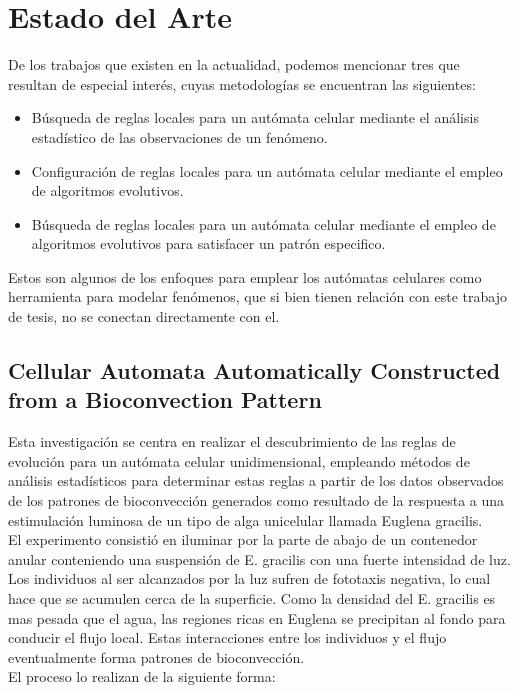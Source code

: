 \chapter{Estado del Arte}

De los trabajos que existen en la actualidad, podemos mencionar tres que resultan de especial interés, cuyas metodologías se encuentran las siguientes:
\begin{itemize}
	\item Búsqueda de reglas locales para un autómata celular mediante el análisis estadístico de las observaciones de un fenómeno.
	\item Configuración de reglas locales para un autómata celular mediante el empleo de algoritmos evolutivos.
	\item Búsqueda de reglas locales para un autómata celular mediante el empleo de algoritmos evolutivos para satisfacer un patrón especifico.
\end{itemize}

Estos son algunos de los enfoques para emplear los autómatas celulares como herramienta para modelar fenómenos, que si bien tienen relación con este trabajo de tesis, no se conectan directamente con el.

\section{Cellular Automata Automatically Constructed from a Bioconvection Pattern}

Esta investigación \citep{kawaharada2016cellular} se centra en realizar el descubrimiento de las reglas de evolución para un autómata celular unidimensional, empleando métodos de análisis estadísticos para determinar estas reglas a partir de los datos observados de los patrones de bioconvección generados como resultado de la respuesta a una estimulación luminosa de un tipo de alga unicelular llamada Euglena gracilis. 
\\
El experimento consistió en iluminar por la parte de abajo de un contenedor anular conteniendo una suspensión de E. gracilis con una fuerte intensidad de luz. Los individuos al ser alcanzados por la luz sufren de fototaxis negativa, lo cual hace que se acumulen cerca de la superficie. Como la densidad del E. gracilis es mas pesada que el agua, las regiones ricas en Euglena se precipitan al fondo para conducir el flujo local. Estas interacciones entre los individuos y el flujo eventualmente forma patrones de bioconvección.
\\
El proceso lo realizan de la siguiente forma:

